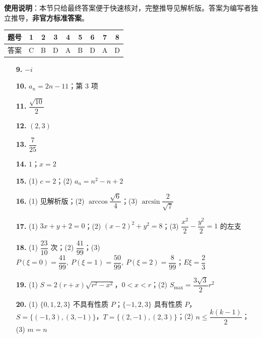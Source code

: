 
\begin{gknotice}
\textbf{使用说明}：本节只给最终答案便于快速核对，完整推导见解析版。答案为编写者独立推导，\textbf{非官方标准答案}。
\end{gknotice}

\begin{center}\begin{tabular}{ccccccccc}
\toprule
题号 & 1 & 2 & 3 & 4 & 5 & 6 & 7 & 8 \\
\midrule
答案 & C & B & D & A & B & D & A & D \\
\bottomrule
\end{tabular}\end{center}

\begin{itemize}[leftmargin=2.6em]
  \item[\textbf{9.}] $-i$
  \item[\textbf{10.}] $a_n=2n-11$；第 3 项
  \item[\textbf{11.}] $\dfrac{\sqrt{10}}2$
  \item[\textbf{12.}] $(2,3)$
  \item[\textbf{13.}] $\dfrac7{25}$
  \item[\textbf{14.}] $1$；$x=2$
\end{itemize}

\begin{itemize}[leftmargin=2.6em]
  \item[\textbf{15.}] (1) $c=2$；(2) $a_n=n^2-n+2$
  \item[\textbf{16.}] (1) 见解析版；(2) $\arccos\dfrac{\sqrt6}4$；(3) $\arcsin\dfrac2{\sqrt7}$
  \item[\textbf{17.}] (1) $3x+y+2=0$；(2) $(x-2)^2+y^2=8$；(3) $\dfrac{x^2}{2}-\dfrac{y^2}{2}=1$ 的左支
  \item[\textbf{18.}] (1) $\dfrac{23}{10}$ 次；(2) $\dfrac{41}{99}$；(3) $P(\xi=0)=\dfrac{41}{99},\ P(\xi=1)=\dfrac{50}{99},\ P(\xi=2)=\dfrac8{99}$；$E\xi=\dfrac23$
  \item[\textbf{19.}] (1) $S=2(r+x)\sqrt{r^2-x^2}$，$0<x<r$；(2) $S_{\max}=\dfrac{3\sqrt3}{2}r^2$
  \item[\textbf{20.}] (1) $\{0,1,2,3\}$ 不具有性质 $P$；$\{-1,2,3\}$ 具有性质 $P$，$S=\{(-1,3),(3,-1)\}$，$T=\{(2,-1),(2,3)\}$；(2) $n\leq\dfrac{k(k-1)}2$；(3) $m=n$
\end{itemize}
